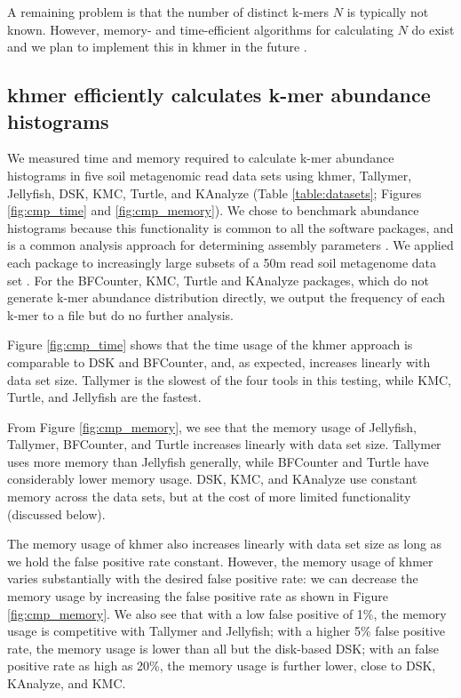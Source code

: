 \documentclass[10pt]{article}
\begin{document}
A remaining problem is that the number of distinct k-mers $N$ is
typically not known.  However, memory- and time-efficient algorithms
for calculating $N$ do exist and we plan to implement this in
khmer in the future \cite{flajolet2008hyperloglog}.

\subsection*{khmer efficiently calculates k-mer abundance histograms}

We measured time and memory required to calculate k-mer abundance
histograms in five soil metagenomic read data sets using khmer,
Tallymer, Jellyfish, DSK, KMC, Turtle, and KAnalyze (Table
\ref{table:datasets}; Figures \ref{fig:cmp_time} and
\ref{fig:cmp_memory}).  We chose to benchmark abundance histograms
because this functionality is common to all the software packages, and
is a common analysis approach for determining assembly parameters
\cite{Chikhi:2014aa}.  We applied each package to increasingly large
subsets of a 50m read soil metagenome data set \cite{Howe2012}. For
the BFCounter, KMC, Turtle and KAnalyze packages, which do not
generate k-mer abundance distribution directly, we output the
frequency of each k-mer to a file but do no further analysis.

Figure \ref{fig:cmp_time} shows that the time usage of the khmer
approach is comparable to DSK and BFCounter, and, as expected,
increases linearly with data set size. Tallymer is the slowest of the
four tools in this testing, while KMC, Turtle, and Jellyfish are
the fastest.

From Figure \ref{fig:cmp_memory}, we see that the memory usage of
Jellyfish, Tallymer, BFCounter, and Turtle increases linearly with
data set size. Tallymer uses more memory than Jellyfish generally,
while BFCounter and Turtle have considerably lower memory usage.
DSK, KMC, and KAnalyze use constant memory across the data sets, but
at the cost of more limited functionality (discussed below).


The memory usage of khmer also increases linearly with data set size
as long as we hold the false positive rate constant.  However, the
memory usage of khmer varies substantially with the desired false
positive rate: we can decrease the memory usage by increasing the
false positive rate as shown in Figure \ref{fig:cmp_memory}.  We also
see that with a low false positive of 1\%, the memory usage is
competitive with Tallymer and Jellyfish; with a higher 5\% false
positive rate, the memory usage is lower than all but the disk-based
DSK; with an false positive rate as high as 20\%, the memory usage is
further lower, close to DSK, KAnalyze, and KMC.
\end{document}
